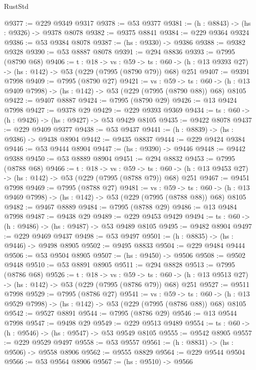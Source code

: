\begin{lexlean}{RustStd}
\begin{coremodule}
@9377 := @229 @9349 @9317
@9378 := @53 @9377
@9381 := (h : @8843) -> (hs : @9326) -> @9378 @8078
@9382 := @9375 @8841
@9384 := @229 @9364 @9324
@9386 := @53 @9384 @8078
@9387 := (hs : @9330) -> @9386
@9388 := @9382 @9328
@9390 := @53 @8887 @8078
@9391 := @294 @8836
@9393 := @7995 (@8790 @68)
@9406 := {t : @18} ->
  {vs : @59} ->
  {ts : @60} -> (h : @13 @9393 @27) -> (hs : @142) -> @53 (@229 (@7995 (@8790 @79)) @68) @251
@9407 := @9391 @7998
@9409 := @7995 (@8790 @27)
@9421 := {vs : @59} ->
  {ts : @60} -> (h : @13 @9409 @7998) -> (hs : @142) -> @53 (@229 (@7995 (@8790 @88)) @68) @8105
@9422 := @9407 @8887
@9424 := @7995 (@8790 @29)
@9426 := @13 @9424 @7998
@9427 := @9378 @29
@9429 := @229 @9393 @9369
@9434 := {ts : @60} -> (h : @9426) -> (hs : @9427) -> @53 @9429 @8105
@9435 := @9422 @8078
@9437 := @229 @9409 @9377
@9438 := @53 @9437
@9441 := (h : @8839) -> (hs : @9386) -> @9438 @8904
@9442 := @9435 @8837
@9444 := @229 @9424 @9384
@9446 := @53 @9444 @8904
@9447 := (hs : @9390) -> @9446
@9448 := @9442 @9388
@9450 := @53 @8889 @8904
@9451 := @294 @8832
@9453 := @7995 (@8788 @68)
@9466 := {t : @18} ->
  {vs : @59} ->
  {ts : @60} -> (h : @13 @9453 @27) -> (hs : @142) -> @53 (@229 (@7995 (@8788 @79)) @68) @251
@9467 := @9451 @7998
@9469 := @7995 (@8788 @27)
@9481 := {vs : @59} ->
  {ts : @60} -> (h : @13 @9469 @7998) -> (hs : @142) -> @53 (@229 (@7995 (@8788 @88)) @68) @8105
@9482 := @9467 @8889
@9484 := @7995 (@8788 @29)
@9486 := @13 @9484 @7998
@9487 := @9438 @29
@9489 := @229 @9453 @9429
@9494 := {ts : @60} -> (h : @9486) -> (hs : @9487) -> @53 @9489 @8105
@9495 := @9482 @8904
@9497 := @229 @9469 @9437
@9498 := @53 @9497
@9501 := (h : @8835) -> (hs : @9446) -> @9498 @8905
@9502 := @9495 @8833
@9504 := @229 @9484 @9444
@9506 := @53 @9504 @8905
@9507 := (hs : @9450) -> @9506
@9508 := @9502 @9448
@9510 := @53 @8891 @8905
@9511 := @294 @8828
@9513 := @7995 (@8786 @68)
@9526 := {t : @18} ->
  {vs : @59} ->
  {ts : @60} -> (h : @13 @9513 @27) -> (hs : @142) -> @53 (@229 (@7995 (@8786 @79)) @68) @251
@9527 := @9511 @7998
@9529 := @7995 (@8786 @27)
@9541 := {vs : @59} ->
  {ts : @60} -> (h : @13 @9529 @7998) -> (hs : @142) -> @53 (@229 (@7995 (@8786 @88)) @68) @8105
@9542 := @9527 @8891
@9544 := @7995 (@8786 @29)
@9546 := @13 @9544 @7998
@9547 := @9498 @29
@9549 := @229 @9513 @9489
@9554 := {ts : @60} -> (h : @9546) -> (hs : @9547) -> @53 @9549 @8105
@9555 := @9542 @8905
@9557 := @229 @9529 @9497
@9558 := @53 @9557
@9561 := (h : @8831) -> (hs : @9506) -> @9558 @8906
@9562 := @9555 @8829
@9564 := @229 @9544 @9504
@9566 := @53 @9564 @8906
@9567 := (hs : @9510) -> @9566

\end{coremodule}
\end{lexlean}
